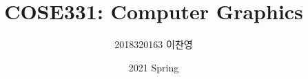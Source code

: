 

\title{COSE331: Computer Graphics}
\author{2018320163 이찬영}
\date{2021 Spring}


    \maketitle
    \tableofcontents
    
    

